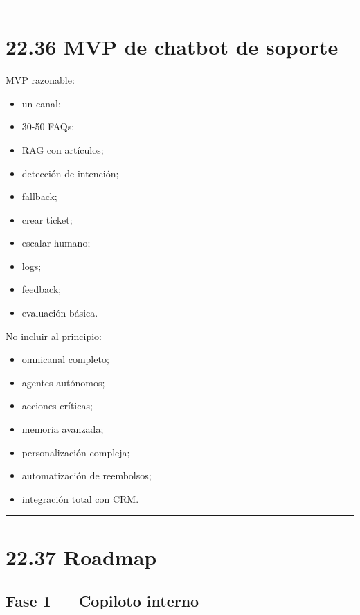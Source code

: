 \begin{center}\rule{0.5\linewidth}{0.5pt}\end{center}

\section{22.36 MVP de chatbot de
soporte}\label{mvp-de-chatbot-de-soporte}

MVP razonable:

\begin{itemize}
\tightlist
\item
  un canal;
\item
  30-50 FAQs;
\item
  RAG con artículos;
\item
  detección de intención;
\item
  fallback;
\item
  crear ticket;
\item
  escalar humano;
\item
  logs;
\item
  feedback;
\item
  evaluación básica.
\end{itemize}

No incluir al principio:

\begin{itemize}
\tightlist
\item
  omnicanal completo;
\item
  agentes autónomos;
\item
  acciones críticas;
\item
  memoria avanzada;
\item
  personalización compleja;
\item
  automatización de reembolsos;
\item
  integración total con CRM.
\end{itemize}

\begin{center}\rule{0.5\linewidth}{0.5pt}\end{center}

\section{22.37 Roadmap}\label{roadmap}

\subsection{Fase 1 --- Copiloto interno}\label{fase-1-copiloto-interno}

